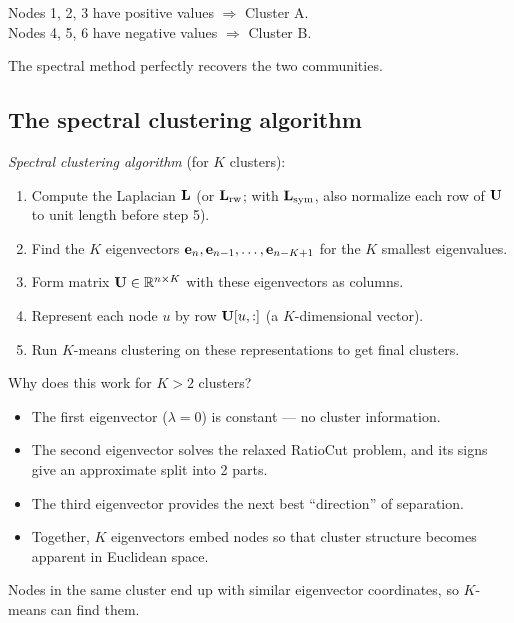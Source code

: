 \begin{notechapter}
\begin{example}
Nodes 1, 2, 3 have positive values $\Rightarrow$ Cluster A.\\
Nodes 4, 5, 6 have negative values $\Rightarrow$ Cluster B.

The spectral method perfectly recovers the two communities.
\end{example}

\subsection{The spectral clustering algorithm}

\begin{keyidea}
\emph{Spectral clustering algorithm} (for $K$ clusters):
\begin{enumerate}
    \item Compute the Laplacian $\mathbf{L}$ (or $\mathbf{L}_{\text{rw}}$; with $\mathbf{L}_{\text{sym}}$, also normalize each row of $\mathbf{U}$ to unit length before step 5).
    \item Find the $K$ eigenvectors $\mathbf{e}_n, \mathbf{e}_{n-1}, \ldots, \mathbf{e}_{n-K+1}$ for the $K$ smallest eigenvalues.
    \item Form matrix $\mathbf{U} \in \mathbb{R}^{n \times K}$ with these eigenvectors as columns.
    \item Represent each node $u$ by row $\mathbf{U}[u, :]$ (a $K$-dimensional vector).
    \item Run $K$-means clustering on these representations to get final clusters.
\end{enumerate}
\end{keyidea}

\begin{intuition}
Why does this work for $K > 2$ clusters?
\begin{itemize}
    \item The first eigenvector ($\lambda = 0$) is constant --- no cluster information.
    \item The second eigenvector solves the relaxed RatioCut problem, and its signs give an approximate split into 2 parts.
    \item The third eigenvector provides the next best ``direction'' of separation.
    \item Together, $K$ eigenvectors embed nodes so that cluster structure becomes apparent in Euclidean space.
\end{itemize}

Nodes in the same cluster end up with similar eigenvector coordinates, so $K$-means can find them.
\end{intuition}


\end{notechapter}
